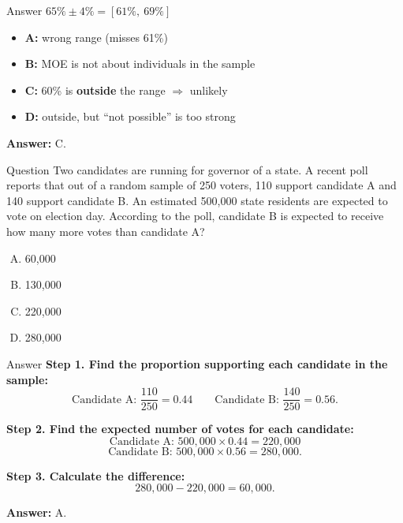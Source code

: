 \documentclass{beamer}
\begin{document}
\begin{frame}{Answer}
$65\% \pm 4\% = [61\%,\ 69\%]$

\vspace{0.1cm}
\begin{itemize}
    \item \textbf{A:} wrong range (misses 61\%)
    \item \textbf{B:} MOE is not about individuals in the sample
    \item \textbf{C:} 60\% is \textbf{outside} the range $\Rightarrow$ unlikely
    \item \textbf{D:} outside, but ``not possible'' is too strong
\end{itemize}

\textbf{Answer:} C.
\end{frame}



\begin{frame}{Question}
Two candidates are running for governor of a state. A recent poll reports that out of a random sample of 250 voters, 110 support candidate A and 140 support candidate B. An estimated 500{,}000 state residents are expected to vote on election day. According to the poll, candidate B is expected to receive how many more votes than candidate A?

\begin{enumerate}[A.]
    \item 60{,}000
    \item 130{,}000
    \item 220{,}000
    \item 280{,}000
\end{enumerate}
\end{frame}


\begin{frame}{Answer}
\textbf{Step 1. Find the proportion supporting each candidate in the sample:}
\[
\text{Candidate A: } \frac{110}{250} = 0.44 \quad \quad
\text{Candidate B: } \frac{140}{250} = 0.56.
\]

\textbf{Step 2. Find the expected number of votes for each candidate:}
\[
\text{Candidate A: } 500{,}000 \times 0.44 = 220{,}000
\]
\[
\text{Candidate B: } 500{,}000 \times 0.56 = 280{,}000.
\]

\textbf{Step 3. Calculate the difference:}
\[
280{,}000 - 220{,}000 = 60{,}000.
\]

\textbf{Answer:} A.
\end{frame}
\end{document}
